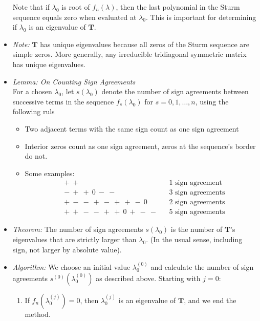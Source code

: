 \documentclass[11pt, a4paper]{article}
\newcommand{\mat}[1]{\mathbf{#1}} %
\begin{document}
\begin{itemize}
	Note that if $ \lambda_0 $ is root of $ f_{n}(\lambda) $, then the last polynomial in the Sturm sequence equals zero when evaluated at $ \lambda_0 $. This is important for determining if $ \lambda_0 $ is an eigenvalue of $ \mat{T} $.
	
	\item \textit{Note:} $ \mat{T} $ has unique eigenvalues because all zeros of the Sturm sequence are simple zeros. More generally, any irreducible tridiagonal symmetric matrix has unique eigenvalues.
	
	\item \textit{Lemma: On Counting Sign Agreements}\\
	For a chosen $ \lambda_0 $, let $ s(\lambda_0) $ denote the number of sign agreements between successive terms in the sequence $ f_{s}(\lambda_0) $ for $ s = 0, 1, \dots, n $, using the following ruls
	\begin{itemize}
		\item Two adjacent terms with the same sign count as one sign agreement
		\item Interior zeros count as one sign agreement, zeros at the sequence's border do not.
		\item Some examples:
		\begin{align*}
			& + \ +  && \text{1 sign agreement}\\
			& - \ + \ + \ 0 \ - \ -  && \text{3 sign agreements}\\
			&+ \ - \ - \ +  \ - \ + \ + \ - \ 0 && \text{2 sign agreements}\\
			&+ \ + \ - \ -  \ + \ + \ 0 \ + \ - \ - && \text{5 sign agreements}
		\end{align*}
		
	\end{itemize}
	
	\item \textit{Theorem:} The number of sign agreements $ s(\lambda_0) $ is the number of $ \mat{T} $'s eigenvalues that are strictly larger than $ \lambda_0 $. (In the usual sense, including sign, not larger by absolute value).
		
	\item \textit{Algorithm:}
	We choose an initial value $ \lambda^{(0)}_0 $ and calculate the number of sign agreements $ s^{(0)}(\lambda^{(0)}_0) $ as described above. Starting with $ j = 0 $:
	\begin{enumerate}
		
		\item If $ f_{n}(\lambda^{(j)}_0) = 0 $, then $ \lambda^{(j)}_0 $ is an eigenvalue of $ \mat{T} $, and we end the method.
		

\end{enumerate}
\end{itemize}
\end{document}
